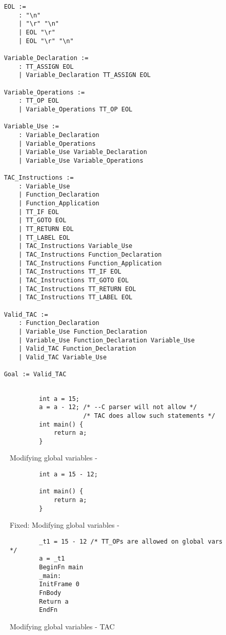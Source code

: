 \begin{verbatim}
	EOL :=
	    : "\n"
	    | "\r" "\n"
	    | EOL "\r"
	    | EOL "\r" "\n"
	
	Variable_Declaration := 
	    : TT_ASSIGN EOL
	    | Variable_Declaration TT_ASSIGN EOL
	
	Variable_Operations :=
	    : TT_OP EOL
	    | Variable_Operations TT_OP EOL
		
	Variable_Use :=
	    : Variable_Declaration
	    | Variable_Operations
	    | Variable_Use Variable_Declaration
	    | Variable_Use Variable_Operations
	
	TAC_Instructions :=
	    : Variable_Use
	    | Function_Declaration
	    | Function_Application
	    | TT_IF EOL
	    | TT_GOTO EOL
	    | TT_RETURN EOL
	    | TT_LABEL EOL
	    | TAC_Instructions Variable_Use
	    | TAC_Instructions Function_Declaration
	    | TAC_Instructions Function_Application
	    | TAC_Instructions TT_IF EOL
	    | TAC_Instructions TT_GOTO EOL
	    | TAC_Instructions TT_RETURN EOL
	    | TAC_Instructions TT_LABEL EOL
	
	Valid_TAC :=
	    : Function_Declaration
	    | Variable_Use Function_Declaration
	    | Variable_Use Function_Declaration Variable_Use
	    | Valid_TAC Function_Declaration
	    | Valid_TAC Variable_Use

	Goal := Valid_TAC
	
\end{verbatim}

\begin{figure}[p]
	\begin{verbatim}
		int a = 15;
		a = a - 12; /* --C parser will not allow */
		            /* TAC does allow such statements */
		int main() {
			return a;
		}
	\end{verbatim}
	\caption{Modifying global variables - \mmc}
	\label{fig:parsefail}
\end{figure}

\begin{figure}[p]
	\begin{verbatim}
		int a = 15 - 12;

		int main() {
			return a;
		}
	\end{verbatim}
	\caption{Fixed: Modifying global variables - \mmc}
	\label{fig:parsefix}
\end{figure}

\begin{figure}[p]
	\begin{verbatim}
		_t1 = 15 - 12 /* TT_OPs are allowed on global vars */
		a = _t1
		BeginFn main
		_main:
		InitFrame 0
		FnBody
		Return a
		EndFn
	\end{verbatim}
	\caption{Modifying global variables - TAC}
	\label{fig:parsefailtac}
\end{figure}


